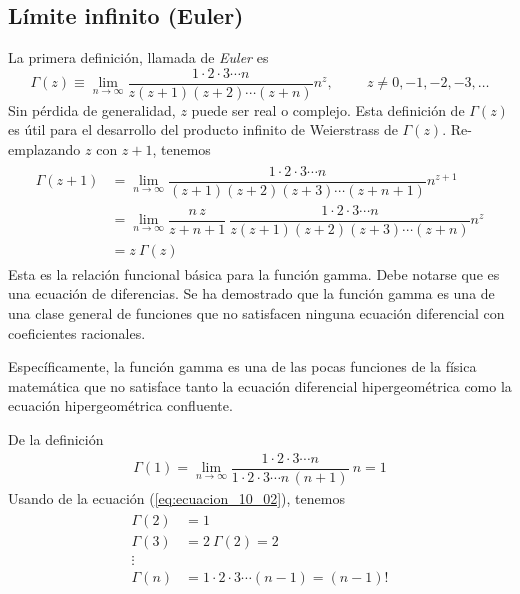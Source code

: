 \subsection{Límite infinito (Euler)}
La primera definición, llamada de \emph{Euler} es
\begin{equation}
\Gamma(z) \equiv \lim_{n \to \infty} \dfrac{1 \cdot 2 \cdot 3 \cdots n}{z (z+1) (z+2) \cdots (z+n)} n^{z}, \hspace{1cm} z \neq 0, -1,-2,-3, \ldots
\label{eq:ecuacion_10_01}
\end{equation}
Sin pérdida de generalidad, $z$ puede ser real o complejo.  Esta definición de $\Gamma(z)$ es útil para el desarrollo del producto infinito de Weierstrass de $\Gamma (z)$. Re-emplazando $z$ con $z + 1$, tenemos
\begin{align}
\begin{aligned}
\Gamma (z + 1) &= \lim_{n \to \infty} \dfrac{1 \cdot 2 \cdot 3 \cdots n}{(z + 1)(z + 2)(z + 3) \cdots (z + n + 1)} n^{z + 1} \\[0.5em]
&= \lim_{n \to \infty} \dfrac{n \, z}{z + n + 1} \: \dfrac{1 \cdot 2 \cdot 3 \cdots n}{z (z + 1)(z + 2)(z + 3) \cdots (z + n)} n^{z} \\[0.5em]
&= z \: \Gamma (z)
\label{eq:ecuacion_10_02}
\end{aligned}
\end{align}
Esta es la relación funcional básica para la función gamma. Debe notarse que es una ecuación de diferencias. Se ha demostrado que la función gamma es una de una clase general de funciones que no satisfacen ninguna ecuación diferencial con coeficientes racionales.
\par
Específicamente, la función gamma es una de las pocas funciones de la física matemática que no satisface tanto la ecuación diferencial hipergeométrica como la ecuación hipergeométrica confluente.
\par
De la definición
\begin{align}
\Gamma (1) = \lim_{n \to \infty} \dfrac{1 \cdot 2 \cdot 3 \cdots n}{1 \cdot 2 \cdot 3 \cdots n \, (n + 1)} \: n = 1
\label{eq:ecuacion_10_03}
\end{align}
Usando de la ecuación (\ref{eq:ecuacion_10_02}), tenemos
\begin{align}
\begin{aligned}
\Gamma (2) &= 1 \\
\Gamma (3) &=  2 \: \Gamma(2) =  2 \\
\vdots \\
\Gamma (n) &= 1 \cdot 2 \cdot 3 \cdots (n-1) =  (n-1)!
\label{eq:ecuacion_10_04}
\end{aligned}
\end{align}
